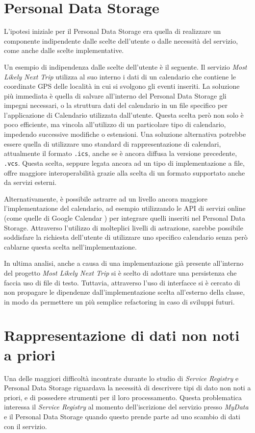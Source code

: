 \section{Personal Data Storage}
\label{sec:A-PDS}
L’ipotesi iniziale per il Personal Data Storage era quella di realizzare un componente indipendente dalle scelte dell’utente o dalle necessit\`a del servizio, come anche dalle scelte implementative. 

Un esempio di indipendenza dalle scelte dell’utente \`e il seguente. Il servizio \textit{Most Likely Next Trip} utilizza al suo interno i dati di un calendario che contiene le coordinate GPS delle localit\`a in cui si svolgono gli eventi inseriti. La soluzione pi\`u immediata \`e quella di salvare all’interno del Personal Data Storage gli impegni necessari, o la struttura dati del calendario in un file specifico per l’applicazione di Calendario utilizzata dall’utente. Questa scelta per\`o non solo \`e poco efficiente, ma vincola all’utilizzo di un particolare tipo di calendario, impedendo successive modifiche o estensioni. Una soluzione alternativa potrebbe essere quella di utilizzare uno standard di rappresentazione di calendari, attualmente il formato \texttt{.ics}, anche se \`e ancora diffusa la versione precedente, \texttt{.vcs}. Questa scelta, seppure legata ancora ad un tipo di implementazione a file, offre maggiore interoperabilit\`a grazie alla scelta di un formato supportato anche da servizi esterni.

Alternativamente, \`e possibile astrarre ad un livello ancora maggiore l’implementazione del calendario, ad esempio utilizzando le API di servizi online (come quelle di Google Calendar \cite{googlecalendarapi}) per integrare quelli inseriti nel Personal Data Storage. Attraverso l’utilizzo di molteplici livelli di astrazione, sarebbe possibile soddisfare la richiesta dell’utente di utilizzare uno specifico calendario senza per\`o cablarne questa scelta nell’implementazione.

In ultima analisi, anche a causa di una implementazione gi\`a presente all’interno del progetto \textit{Most Likely Next Trip} si \`e scelto di adottare una persistenza che faccia uso di file di testo. Tuttavia, attraverso l’uso di interfacce si \`e cercato di non propagare le dipendenze dall’implementazione scelta all’esterno della classe, in modo da permettere un pi\`u semplice refactoring in caso di sviluppi futuri.

\section{Rappresentazione di dati non noti a priori}
\label{sec:A-datinonnotiapriori}
Una delle maggiori difficolt\`a incontrate durante lo studio di \textit{Service Registry} e Personal Data Storage riguardava la necessit\`a di descrivere tipi di dato non noti a priori, e di possedere strumenti per il loro processamento. Questa problematica interessa il \textit{Service Registry} al momento dell’iscrizione del servizio presso \textit{MyData} e il Personal Data Storage quando questo prende parte ad uno scambio di dati con il servizio.

